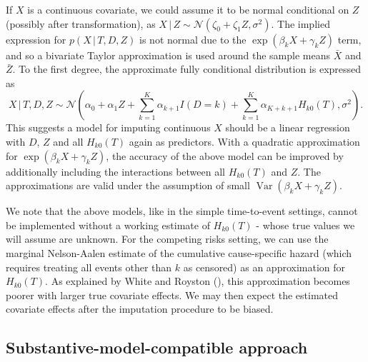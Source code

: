 \documentclass[
  letterpaper,
  paper=240mm:170mm,
  twoside=true,
  open=right,
  fontsize=10pt,
  pagesize=false,
  BCOR=15mm,
  DIV=14,
  headinclude=true,
  footinclude=false,
  headsepline=on]{scrbook}
\DeclareMathOperator{\Var}{Var}
\newcommand{\given}{\,|\,}
\begin{document}
If \(X\) is a continuous covariate, we could assume it to be normal
conditional on \(Z\) (possibly after transformation), as
\(X \given Z \sim \mathcal{N}(\zeta_0 + \zeta_1 Z, \sigma^2)\). The
implied expression for \(p(X \given T, D, Z)\) is not normal due to the
\(\exp(\beta_k X + \gamma_k Z)\) term, and so a bivariate Taylor
approximation is used around the sample means \(\bar{X}\) and
\(\bar{Z}\). To the first degree, the approximate fully conditional
distribution is expressed as \begin{equation*}
    X \given T, D, Z \sim \mathcal{N}(\alpha_0 + \alpha_1 Z + \sum^K_{k = 1} \alpha_{k+1} I(D=k) + \sum^K_{k = 1} \alpha_{K + k + 1} H_{k0}(T),\sigma^2).
\end{equation*} This suggests a model for imputing continuous \(X\)
should be a linear regression with \(D\), \(Z\) and all \(H_{k0}(T)\)
again as predictors. With a quadratic approximation for
\(\exp(\beta_k X + \gamma_k Z)\), the accuracy of the above model can be
improved by additionally including the interactions between all
\(H_{k0}(T)\) and \(Z\). The approximations are valid under the
assumption of small \(\Var(\beta_k X + \gamma_k Z)\).

We note that the above models, like in the simple time-to-event
settings, cannot be implemented without a working estimate of
\(H_{k0}(T)\) - whose true values we will assume are unknown. For the
competing risks setting, we can use the marginal Nelson-Aalen estimate
of the cumulative cause-specific hazard (which requires treating all
events other than \(k\) as censored) as an approximation for
\(H_{k0}(T)\). As explained by White and Royston
(), this
approximation becomes poorer with larger true covariate effects. We may
then expect the estimated covariate effects after the imputation
procedure to be biased.

\subsection{Substantive-model-compatible
approach}\label{sec-smcfcs-theory}
\end{document}
